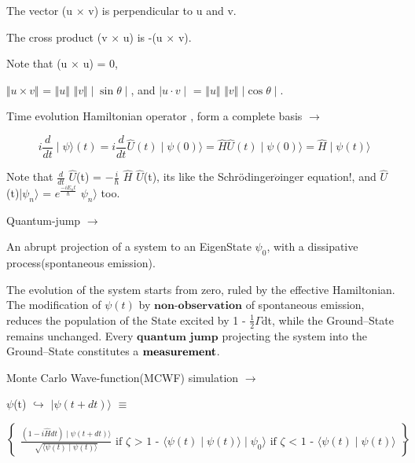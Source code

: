 \documentclass[a4paper, 10pt, onepage]{elegantbook}
\begin{document}
{The vector (u $\times$ v) is perpendicular to u and v.  

The cross product (v $\times$ u) is -(u $\times$ v).  

Note that (u $\times$ u) = 0,  
 
$\Vert u  \times v \Vert$ = $\Vert u \Vert$ $\Vert v \Vert \mid \sin \theta \mid$, and $\mid u \cdot v \mid$ = $\Vert u 
\Vert$ $\Vert v \Vert$ $\mid \cos \theta
\mid$.  

Time evolution Hamiltonian operator \label{eq:
Time evolution Hamiltonian operator}, form a complete basis $\rightarrow$  

\begin{equation}
i \frac{d}{dt} \mid \psi \rangle(t) = i \frac{d}{dt} \hat U (t) \mid \psi (0) \rangle = \hat H \hat U(t) \mid \psi(0) 
\rangle = \hat H \mid \psi (t) \rangle
\end{equation}
\noindent

Note that $\frac{d}{dt}$ $\hat U$(t) = $ - \frac{i}{\hbar}$ $\hat H$ $\hat U$(t), its like the Schr\"odinger$\ddot{o}$inger 
equation!, and
$\hat U$(t)|$\psi_n \rangle$ = $e^ \frac{ - iE_nt}{\hbar}$ $\psi_n \rangle$ too. 

Quantum-jump $\rightarrow$ 
    
An abrupt projection of a system to an EigenState $\psi_0$, with a dissipative process(spontaneous emission). 

The evolution of the system starts from zero, ruled by the effective Hamiltonian. The modification of $\psi (t)$ by 
$\mathbf{\textbf{non-observation}}$ of spontaneous emission, reduces the population of the State excited by 1 - 
$\frac{1}{2} \Gamma$dt, while the Ground--State remains unchanged. Every $\mathbf{\textbf{quantum jump}}$ projecting the 
system into the Ground--State constitutes a $\mathbf{\textbf{measurement\index{measurement}}}$.  

Monte Carlo Wave-function(MCWF) simulation $\rightarrow$  

$\psi$(t) $\hookrightarrow$ $\mid \psi(t + dt) \rangle$ $\equiv$  

$\left\{
\begin{array} {ll}
\frac{(1 - i \hat H dt) \mid  \psi(t + dt) \rangle}{\sqrt{ \langle \psi(t) \mid \psi(t) \rangle}} \text{ if $\zeta$ > 1 
- $\langle \psi(t) \mid\psi(t) \rangle$} 
\mid \psi_0 \rangle \text{ if $\zeta$ < 1 - $\langle \psi(t) \mid \psi(t) \rangle$} 
\end{array}
\right\}.$

}
\end{document}
